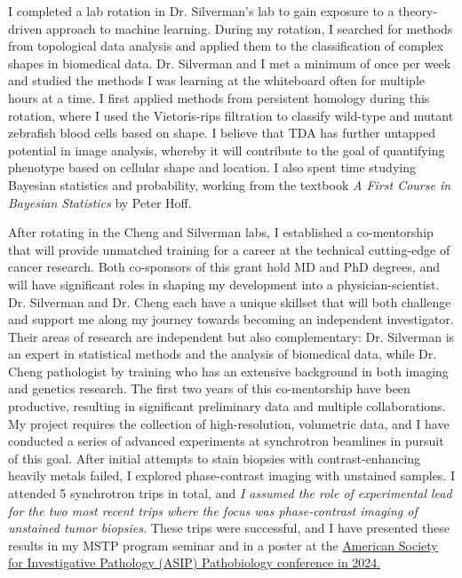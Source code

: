 \documentclass{NIHGrant}
\begin{document}
I completed a lab rotation in Dr. Silverman's lab to gain exposure to a theory-driven approach to machine learning. During my rotation, I searched for methods from topological data analysis and applied them to the classification of complex shapes in biomedical data. Dr. Silverman and I met a minimum of once per week and studied the methods I was learning at the whiteboard often for multiple hours at a time. I first applied methods from persistent homology during this rotation, where I used the Vietoris-rips filtration to classify wild-type and mutant zebrafish blood cells based on shape. I believe that TDA has further untapped potential in image analysis, whereby it will contribute to the goal of quantifying phenotype based on cellular shape and location. I also spent time studying Bayesian statistics and probability, working from the textbook \textit{A First Course in Bayesian Statistics} by Peter Hoff.

After rotating in the Cheng and Silverman labs, I established a co-mentorship that will provide unmatched training for a career at the technical cutting-edge of cancer research. {Both co-sponsors of this grant hold MD and PhD degrees, and will have significant roles in shaping my development into a physician-scientist.} Dr. Silverman and Dr. Cheng each have a unique skillset that will both challenge and support me along my journey towards becoming an independent investigator. Their areas of research are independent but also complementary: Dr. Silverman is an expert in statistical methods and the analysis of biomedical data, while Dr. Cheng pathologist by training who has an extensive background in both imaging and genetics research. The first two years of this co-mentorship have been productive, resulting in significant preliminary data and multiple collaborations. My project requires the collection of high-resolution, volumetric data, and I have conducted a series of advanced experiments at synchrotron beamlines in pursuit of this goal. After initial attempts to stain biopsies with contrast-enhancing heavily metals failed, I explored phase-contrast imaging with unstained samples. I attended 5 synchrotron trips in total, and \emph{I assumed the role of experimental lead for the two most recent trips where the focus was phase-contrast imaging of unstained tumor biopsies.} These trips were successful, and I have presented these results in my MSTP program seminar and in a poster at the \uline{American Society for Investigative Pathology (ASIP) Pathobiology conference in 2024.}
\end{document}
